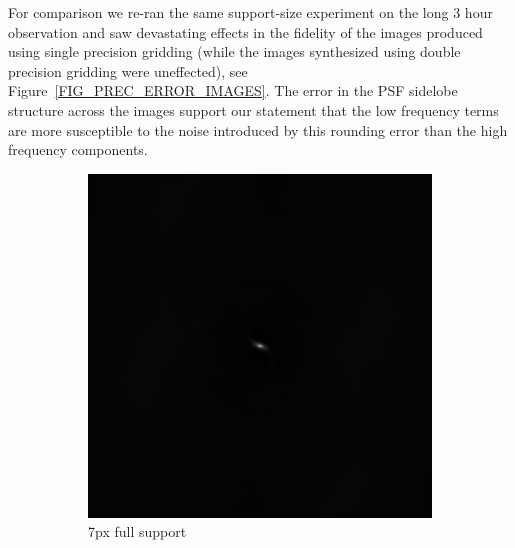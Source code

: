 For comparison we re-ran the same support-size experiment on the long 3 hour observation and saw devastating effects in the fidelity of the images produced using single precision gridding (while the images synthesized using double precision
gridding were uneffected), see Figure~\ref{FIG_PREC_ERROR_IMAGES}. The error in the PSF sidelobe structure across the images support our statement that the low frequency terms are more susceptible to the noise introduced by this rounding
error than the high frequency components.
\begin{figure}[ht!]
 \begin{mdframed} \centering
    \begin{subfigure}[b]{0.45\textwidth}\centering
      \includegraphics[width=\textwidth]{images/180min_single_7.png}
      \caption{7px full support}
    \end{subfigure}
    \begin{subfigure}[b]{0.45\textwidth}\centering

\end{subfigure}
\end{mdframed}
\end{figure}
